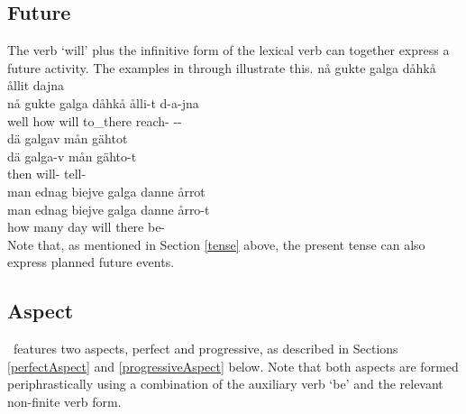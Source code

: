 \subsection{Future}\label{futureTense}
The verb  ‘will’ plus the infinitive form of the lexical verb can together express a future activity. The examples in  through  illustrate this.
\ea\label{futureTenseEx1}%
\glll	nå gukte galga dåhkå ållit dajna\\
	nå gukte galga dåhkå ålli-t d-a-jna\\
	well how will\BS{} to\_there reach- --\\\nopagebreak
{}	
\z
\ea\label{futureTenseEx2}%
\glll	dä galgav mån gähtot\\
	dä galga-v mån gähto-t\\
	then will-  tell-\\\nopagebreak
{}	
\z
\ea\label{futureTenseEx3}%
\glll	man ednag biejve galga danne årrot\\
	man ednag biejve galga danne årro-t\\
	how many day\BS{} will\BS{} there be-\\\nopagebreak
{}	
\z
Note that, as mentioned in Section \ref{tense} above, the present tense can also express planned future events. 

\subsection{Aspect}\label{aspect}
\PS\ features two aspects, perfect and progressive, as described in Sections \ref{perfectAspect} and \ref{progressiveAspect} below. Note that both aspects are formed periphrastically using a combination of the auxiliary verb  ‘be’ and the relevant non-finite verb form. 

